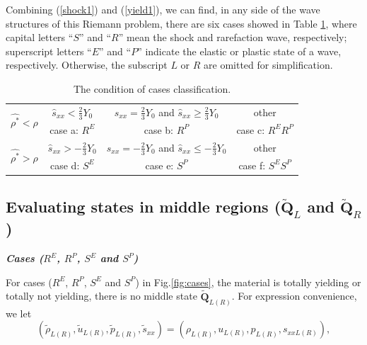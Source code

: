 \documentclass{article}
\numberwithin{equation}{section}
\numberwithin{table}{section}
\begin{document}
Combining (\ref{shock1}) and (\ref{yield1}), we can find, in any side of the wave structures of this Riemann problem, there are six cases showed in Table \ref{tab:cases}, where capital letters ``$S$'' and ``$R$'' mean the shock and rarefaction wave, respectively; superscript letters ``$E$'' and  ``$P$'' indicate the elastic or plastic state of a wave, respectively. Otherwise, the  subscript $L$ or  $R$  are omitted for simplification.


\begin{table}
  \centering
  \caption{The condition of  cases classification.}
  \begin{tabular}{c|ccc}
	\toprule
	\multirow{2}{*}{  $\hat{\rho^*} <\rho$ }  &  $\hat{s}_{xx}<\frac{2}{3}Y_0$ & $s_{xx}=\frac{2}{3}Y_0$ and  $\hat{s}_{xx} \geq \frac{2}{3}Y_0$ &  other\\
	\cline{2-4}
 & case a: $R^{E}$ & case b: $ R^{P}$ & case c: $R^{E}R^{P}$ \\
 \hline
 \multirow{2}{*}{  $\hat{\rho^*} >\rho$ } & $\hat{s}_{xx} > -\frac{2}{3}Y_0$ & $s_{xx}=-\frac{2}{3}Y_0$  and  $\hat{s}_{xx} \leq -\frac{2}{3}Y_0$&  other\\
	\cline{2-4}
  & case d: $S^{E}$ & case e: $ S^{P}$ & case f: $S^{E}S^{P}$ \\
  \bottomrule
\end{tabular}
\label{tab:cases}
\end{table}

\subsection{Evaluating states in  middle regions ($\tilde{\mathbf{Q}}_{L}$ and   $\tilde{\mathbf{Q}}_{R}$) }


\emph{\textbf{Cases ($R^{E}$, $R^{P}$, $S^{E}$ and $S^{P}$)}}

 For cases ($R^{E}$, $R^{P}$, $S^{E}$ and $S^{P}$) in Fig.\ref{fig:cases}, the material is totally yielding or totally not yielding, there is no middle state $\tilde{\mathbf{Q}}_{L(R)}$. For  expression convenience, we let
 \begin{equation}
   (\tilde{\rho}_{L(R)},\tilde{u}_{L(R)},\tilde{p}_{L(R)},\tilde{s}_{xx}) =(\rho_{L(R)}, u_{L(R)},p_{L(R)},s_{xxL(R)}),
\end{equation}
\end{document}
